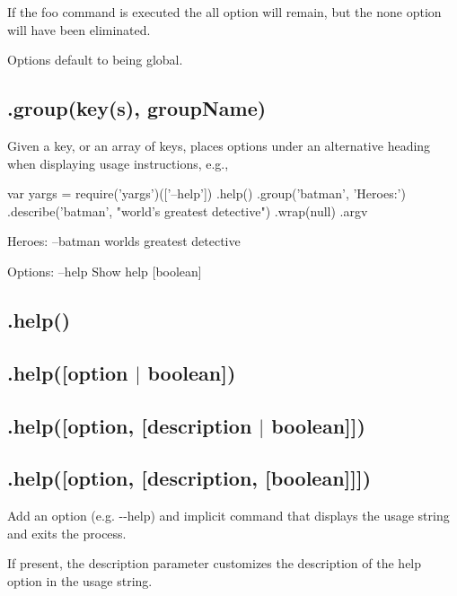 If the {\ttfamily foo} command is executed the {\ttfamily all} option will remain, but the {\ttfamily none} option will have been eliminated.

Options default to being global.

\subsection*{\label{_group}%
.group(key(s), group\+Name) }

Given a key, or an array of keys, places options under an alternative heading when displaying usage instructions, e.\+g.,


\begin{DoxyCode}
var yargs = require('yargs')(['--help'])
  .help()
  .group('batman', 'Heroes:')
  .describe('batman', "world's greatest detective")
  .wrap(null)
  .argv
\end{DoxyCode}
 

 Heroes\+: --batman world\textquotesingle{}s greatest detective

Options\+: --help Show help \mbox{[}boolean\mbox{]}

\subsection*{\label{_help}%
.help() }

\subsection*{.help(\mbox{[}option $\vert$ boolean\mbox{]}) }

\subsection*{.help(\mbox{[}option, \mbox{[}description $\vert$ boolean\mbox{]}\mbox{]}) }

\subsection*{.help(\mbox{[}option, \mbox{[}description, \mbox{[}boolean\mbox{]}\mbox{]}\mbox{]}) }

Add an option (e.\+g. {\ttfamily -\/-\/help}) and implicit command that displays the usage string and exits the process.

If present, the {\ttfamily description} parameter customizes the description of the help option in the usage string.

